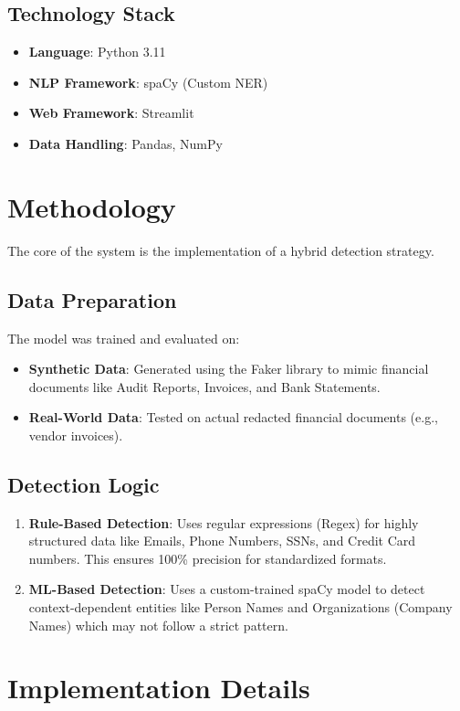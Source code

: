 \documentclass[12pt,a4paper]{article}
\begin{document}
\subsection{Technology Stack}
\begin{itemize}
    \item \textbf{Language}: Python 3.11
    \item \textbf{NLP Framework}: spaCy (Custom NER)
    \item \textbf{Web Framework}: Streamlit
    \item \textbf{Data Handling}: Pandas, NumPy
\end{itemize}

\section{Methodology}
The core of the system is the implementation of a hybrid detection strategy.

\subsection{Data Preparation}
The model was trained and evaluated on:
\begin{itemize}
    \item \textbf{Synthetic Data}: Generated using the Faker library to mimic financial documents like Audit Reports, Invoices, and Bank Statements.
    \item \textbf{Real-World Data}: Tested on actual redacted financial documents (e.g., vendor invoices).
\end{itemize}

\subsection{Detection Logic}
\begin{enumerate}
    \item \textbf{Rule-Based Detection}: Uses regular expressions (Regex) for highly structured data like Emails, Phone Numbers, SSNs, and Credit Card numbers. This ensures 100\% precision for standardized formats.
    \item \textbf{ML-Based Detection}: Uses a custom-trained spaCy model to detect context-dependent entities like Person Names and Organizations (Company Names) which may not follow a strict pattern.
\end{enumerate}

\section{Implementation Details}
\end{document}

